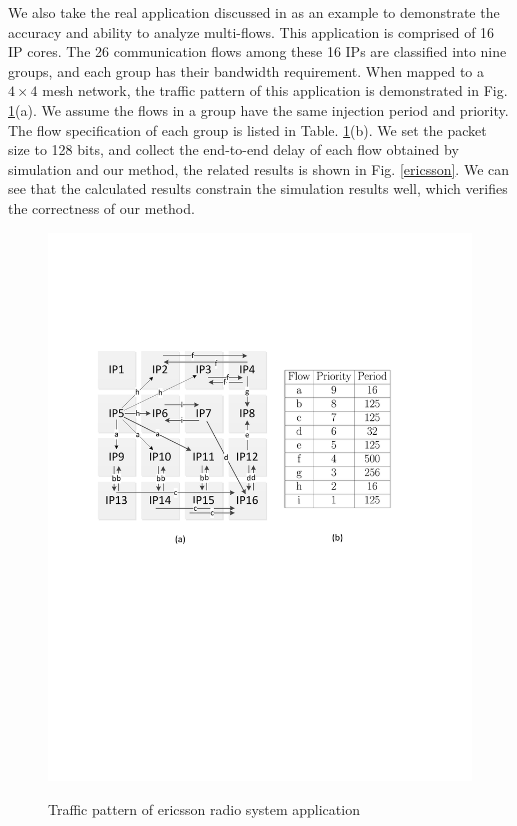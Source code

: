 \documentclass[preprint]{elsarticle}
\begin{document}
We also take the real application discussed in \cite{LuJa08}\cite{Jafari1922089} as an example to demonstrate the accuracy and ability to analyze multi-flows. This application is comprised of 16 IP cores. The 26 communication flows among these 16 IPs are classified into nine groups, and each group has their bandwidth requirement. When mapped to a $4\times 4$ mesh network, the traffic pattern of this application is demonstrated in Fig. \ref{trafficpattern}(a). We assume the flows in a group have the same injection period and priority. The flow specification of each group is listed in Table. \ref{trafficpattern}(b). We set the packet size to 128 bits, and collect the end-to-end delay of each flow obtained by simulation and our method, the related results is shown in Fig. \ref{ericsson}. We can see that the calculated results constrain the simulation results well, which verifies the correctness of our method.
\begin{figure}
  \centering
  \includegraphics[scale=0.7]{figures/trafficpattern.pdf}\\
  \caption{Traffic pattern of ericsson radio system application}\label{trafficpattern}
\end{figure}
\end{document}
